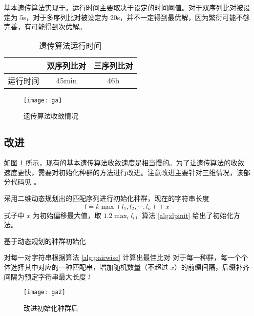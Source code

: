     基本遗传算法实现于。运行时间主要取决于设定的时间阈值。对于双序列比对被设定为 5s，对于多序列比对被设定为 20s，并不一定得到最优解，因为繁衍可能不够完善，有可能得到次优解。

    \noindent
    \begin{minipage}{0.6\textwidth}
        \begin{table}[H]
            \centering
            \caption{遗传算法运行时间}\label{tab:ga}
            \begin{tabular}{ccc}
                \toprule
                 & 双序列比对 & 三序列比对 \\
                \midrule
                运行时间 & 45min & 46h \\
                \bottomrule
            \end{tabular}
        \end{table}
    \end{minipage}
    \begin{minipage}{0.4\textwidth}
        \begin{figure}[H]
            \centering
            \texttt{[image: ga]}
            \caption{遗传算法收敛情况}\label{fig:ga}
        \end{figure}
    \end{minipage}
    \vspace*{5pt}

    \subsection{改进}

    如图 \ref{fig:ga} 所示，现有的基本遗传算法收敛速度是相当慢的。为了让遗传算法的收敛速度更快，需要对初始化种群的方法进行改进。注意改进主要针对三维情况，该部分代码见 。

    采用二维动态规划出的匹配序列进行初始化种群\cite{simplega}，现在的字符串长度
    \begin{equation}
        l = k\max{(l_1,l_2,\cdots,l_n)}+x
    \end{equation}
    式子中 $x$ 为初始偏移最大值，取 $1.2\max_i{l_i}$，算法 \ref{alg:dpinit} 给出了初始化方法。

    \noindent
    \begin{minipage}{0.6\textwidth}
        \begin{algorithm}[H]
            \caption{基于动态规划的种群初始化}\label{alg:dpinit}
            对每一对字符串根据算法 \ref{alg:pairwise} 计算出最佳比对\;
            对于每一种群，每一个个体选择其中对应的一种匹配串，增加随机数量（不超过 $x$）的前缀间隔，后缀补齐间隔为预定字符串最大长度 $l$\;
        \end{algorithm}
    \end{minipage}
    \begin{minipage}{0.4\textwidth}
        \begin{figure}[H]
            \centering
            \texttt{[image: ga2]}
            \caption{改进初始化种群后}\label{fig:ga2}
        \end{figure}
    \end{minipage}
    \vspace*{5pt}

